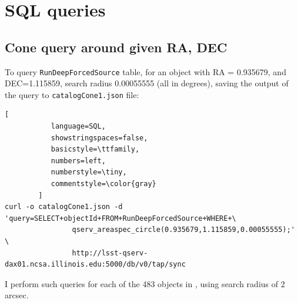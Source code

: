 \documentclass[fleqn,usenatbib]{mnras} %
\begin{document}







\onecolumn
\appendix

\section{SQL queries}
\subsection{Cone query around given RA, DEC}

To query \verb|RunDeepForcedSource| table, for an object with RA = 0.935679, and DEC=1.115859, search radius 0.00055555 (all in degrees), saving the output of the query to \verb|catalogCone1.json| file:

\begin{lstlisting}[
           language=SQL,
           showstringspaces=false,
           basicstyle=\ttfamily,
           numbers=left,
           numberstyle=\tiny,
           commentstyle=\color{gray}
        ]
curl -o catalogCone1.json -d 'query=SELECT+objectId+FROM+RunDeepForcedSource+WHERE+\
                qserv_areaspec_circle(0.935679,1.115859,0.00055555);' \
                http://lsst-qserv-dax01.ncsa.illinois.edu:5000/db/v0/tap/sync
\end{lstlisting}

I perform such queries for each of the 483 objects in \cite{sesar2010}, using search radius of 2 arcsec. 
\end{document}
